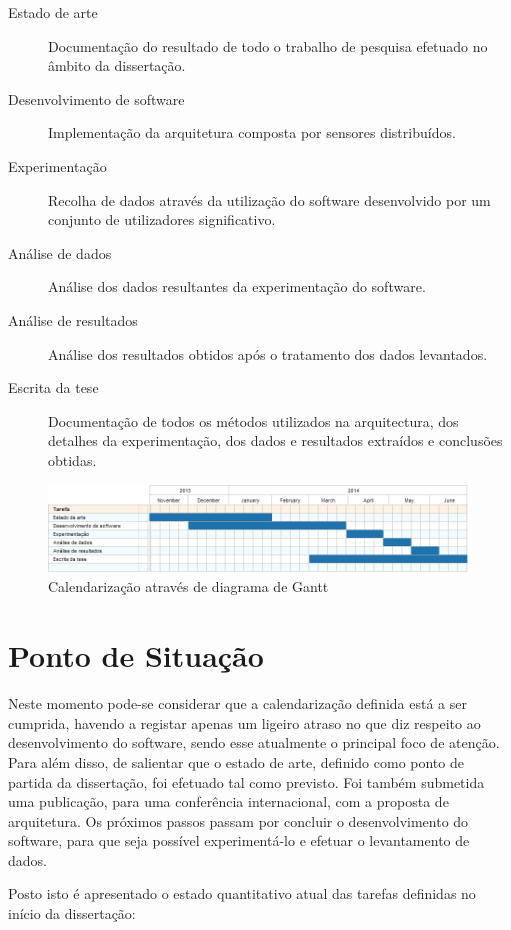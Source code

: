 \begin{description}
	\item[Estado de arte] Documentação do resultado de todo o trabalho de pesquisa efetuado no âmbito da dissertação.
	\item[Desenvolvimento de software] Implementação da arquitetura composta por sensores distribuídos.
	\item[Experimentação] Recolha de dados através da utilização do software desenvolvido por um conjunto de utilizadores significativo.
	\item[Análise de dados] Análise dos dados resultantes da experimentação do software.
	\item[Análise de resultados] Análise dos resultados obtidos após o tratamento dos dados levantados.
	\item[Escrita da tese] Documentação de todos os métodos utilizados na arquitectura, dos detalhes da experimentação, dos dados e resultados extraídos e conclusões obtidas.
\end{description}

\begin{figure}[htb]
   \centering
   \includegraphics[scale=0.6]{Images/planotese.png}
   \caption{Calendarização através de diagrama de Gantt}
\end{figure}

\section{Ponto de Situação}

Neste momento pode-se considerar que a calendarização definida está a ser cumprida, havendo a registar apenas um ligeiro atraso no que diz respeito ao desenvolvimento do software, sendo esse atualmente o principal foco de atenção. Para além disso, de salientar que o estado de arte, definido como ponto de partida da dissertação, foi efetuado tal como previsto. Foi também submetida uma publicação, para uma conferência internacional, com a proposta de arquitetura. Os próximos passos passam por concluir o desenvolvimento do software, para que seja possível experimentá-lo e efetuar o levantamento de dados.

Posto isto é apresentado o estado quantitativo atual das tarefas definidas no início da dissertação:

